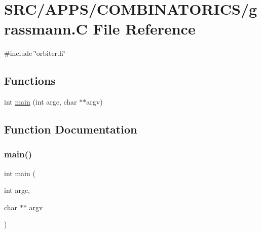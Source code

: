 \hypertarget{_a_p_p_s_2_c_o_m_b_i_n_a_t_o_r_i_c_s_2grassmann_8_c}{}\section{S\+R\+C/\+A\+P\+P\+S/\+C\+O\+M\+B\+I\+N\+A\+T\+O\+R\+I\+C\+S/grassmann.C File Reference}
\label{_a_p_p_s_2_c_o_m_b_i_n_a_t_o_r_i_c_s_2grassmann_8_c}
{\ttfamily \#include \char`\"{}orbiter.\+h\char`\"{}}\newline
\subsection*{Functions}
\begin{DoxyCompactItemize}
\item 
int \mbox{\hyperlink{_a_p_p_s_2_c_o_m_b_i_n_a_t_o_r_i_c_s_2grassmann_8_c_a3c04138a5bfe5d72780bb7e82a18e627}{main}} (int argc, char $\ast$$\ast$argv)
\end{DoxyCompactItemize}


\subsection{Function Documentation}
\mbox{\label{_a_p_p_s_2_c_o_m_b_i_n_a_t_o_r_i_c_s_2grassmann_8_c_a3c04138a5bfe5d72780bb7e82a18e627}} 
\subsubsection{\texorpdfstring{main()}{main()}}
{\footnotesize\ttfamily int main (\begin{DoxyParamCaption}\item[{int}]{argc,  }\item[{char $\ast$$\ast$}]{argv }\end{DoxyParamCaption})}

